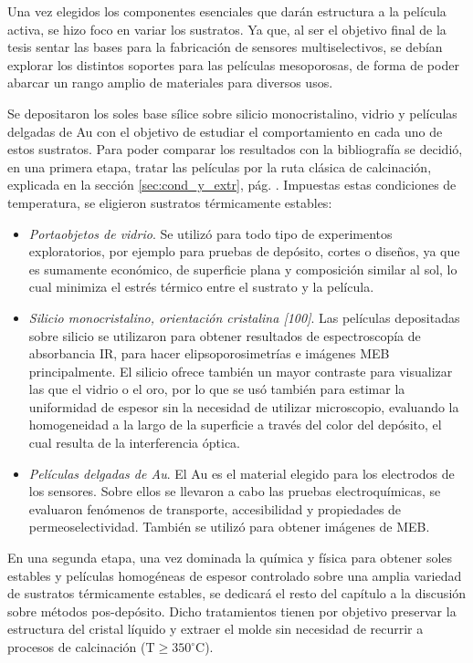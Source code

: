 	Una vez elegidos los componentes esenciales que darán estructura a la película activa, se hizo foco en variar los sustratos. Ya que, al ser el objetivo final de la tesis sentar las bases para la fabricación de sensores multiselectivos, se debían explorar los distintos soportes para las películas mesoporosas, de forma de poder abarcar un rango amplio de materiales para diversos usos.

	Se depositaron los soles base sílice sobre silicio monocristalino, vidrio y películas delgadas de Au con el objetivo de estudiar el comportamiento en cada uno de estos sustratos. Para poder comparar los resultados con la bibliografía\cite{Soler-Illia2006,Brinker1990} se decidió, en una primera etapa, tratar las películas por la ruta clásica de calcinación, explicada en la sección \ref{sec:cond_y_extr}, pág. \pageref{sec:cond_y_extr}. Impuestas estas condiciones de temperatura, se eligieron sustratos térmicamente estables:

		\begin{itemize}
			\item \textit{Portaobjetos de vidrio}. Se utilizó para todo tipo de experimentos exploratorios, por ejemplo para pruebas de depósito, cortes o diseños, ya que es sumamente económico, de superficie plana y composición similar al sol, lo cual minimiza el estrés térmico entre el sustrato y la película.

			\item \textit{Silicio monocristalino, orientación cristalina [100]}. Las películas depositadas sobre silicio se utilizaron para obtener resultados de espectroscopía de absorbancia IR, para hacer elipsoporosimetrías e imágenes MEB principalmente. El silicio ofrece también un mayor contraste para visualizar las \pdm\space que el vidrio o el oro, por lo que se usó también para estimar la uniformidad de espesor sin la necesidad de utilizar microscopio, evaluando la homogeneidad a la largo de la superficie a través del color del depósito, el cual resulta de la interferencia óptica.
		
			\item \textit{Películas delgadas de Au}. El Au es el material elegido para los electrodos de los sensores. Sobre ellos se llevaron a cabo las pruebas electroquímicas, se evaluaron fenómenos de transporte, accesibilidad y propiedades de permeoselectividad. También se utilizó para obtener imágenes de MEB. 
			\end{itemize}
	
	En una segunda etapa, una vez dominada la química y física para obtener soles estables y películas homogéneas de espesor controlado sobre una amplia variedad de sustratos térmicamente estables, se dedicará el resto del capítulo a la discusión sobre métodos pos-depósito. Dicho tratamientos tienen por objetivo preservar la estructura del cristal líquido y extraer el molde sin necesidad de recurrir a procesos de calcinación ($\text{T} \geq 350^\circ \text{C}$).

